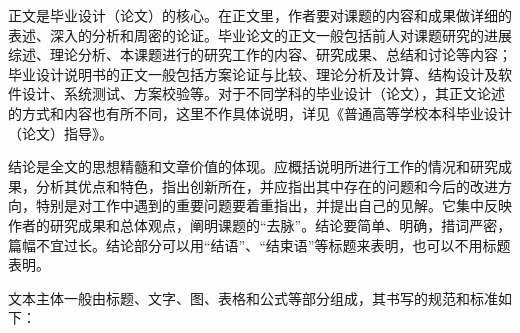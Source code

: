 \documentclass{HDU-Bachelor-Thesis}
\begin{document}
正文是毕业设计（论文）的核心。在正文里，作者要对课题的内容和成果做详细的表述、深入的分析和周密的论证。毕业论文的正文一般包括前人对课题研究的进展综述、理论分析、本课题进行的研究工作的内容、研究成果、总结和讨论等内容；毕业设计说明书的正文一般包括方案论证与比较、理论分析及计算、结构设计及软件设计、系统测试、方案校验等。对于不同学科的毕业设计（论文），其正文论述的方式和内容也有所不同，这里不作具体说明，详见《普通高等学校本科毕业设计（论文）指导》\cite{putong-wenkejuan,putong-ligongkejuan}。

结论是全文的思想精髓和文章价值的体现。应概括说明所进行工作的情况和研究成果，分析其优点和特色，指出创新所在，并应指出其中存在的问题和今后的改进方向，特别是对工作中遇到的重要问题要着重指出，并提出自己的见解。它集中反映作者的研究成果和总体观点，阐明课题的“去脉”。结论要简单、明确，措词严密，篇幅不宜过长。结论部分可以用“结语”、“结束语”等标题来表明，也可以不用标题表明。

文本主体一般由标题、文字、图、表格和公式等部分组成，其书写的规范和标准如下：
\end{document}

